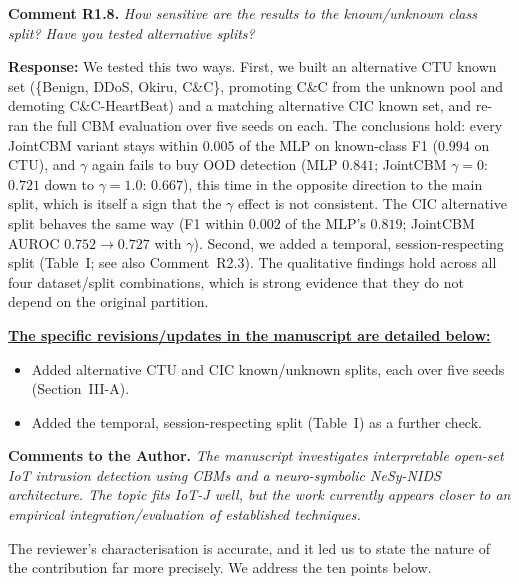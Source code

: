 \documentclass[11pt]{article}
\newcommand{\reviewer}[1]{\bigskip\noindent{\Large\textbf{Reviewer~#1}}\par\medskip}
\newcommand{\cmt}[2]{\medskip\noindent\textbf{Comment #1.} \textit{#2}\par}
\newcommand{\resp}{\smallskip\par\noindent\textbf{Response:} }
\newcommand{\revs}{\smallskip\par\noindent\underline{\textbf{The specific revisions/updates in the manuscript are detailed below:}}\par}
\begin{document}
\cmt{R1.8}{How sensitive are the results to the known/unknown class split? Have
you tested alternative splits?}
\resp We tested this two ways. First, we built an alternative CTU known set
(\{Benign, DDoS, Okiru, C\&C\}, promoting C\&C from the unknown pool and demoting
C\&C-HeartBeat) and a matching alternative CIC known set, and re-ran the full CBM
evaluation over five seeds on each. The conclusions hold: every JointCBM variant
stays within $0.005$ of the MLP on known-class F1 ($0.994$ on CTU), and $\gamma$
again fails to buy OOD detection (MLP $0.841$; JointCBM $\gamma{=}0$: $0.721$ down
to $\gamma{=}1.0$: $0.667$), this time in the opposite direction to the main split,
which is itself a sign that the $\gamma$ effect is not consistent. The CIC
alternative split behaves the same way (F1 within $0.002$ of the MLP's $0.819$;
JointCBM AUROC $0.752{\to}0.727$ with $\gamma$). Second, we added a temporal,
session-respecting split (Table~I; see also Comment~R2.3). The qualitative
findings hold across all four dataset/split combinations, which is strong evidence
that they do not depend on the original partition.
\revs
\begin{itemize}
  \item Added alternative CTU and CIC known/unknown splits, each over five seeds
  (Section~III-A).
  \item Added the temporal, session-respecting split (Table~I) as a further check.
\end{itemize}

\reviewer{2}
\noindent\textbf{Comments to the Author.} \textit{The manuscript investigates
interpretable open-set IoT intrusion detection using CBMs and a neuro-symbolic
NeSy-NIDS architecture. The topic fits IoT-J well, but the work currently appears
closer to an empirical integration/evaluation of established techniques.}

\smallskip
The reviewer's characterisation is accurate, and it led us to state the nature of
the contribution far more precisely. We address the ten points below.
\end{document}

